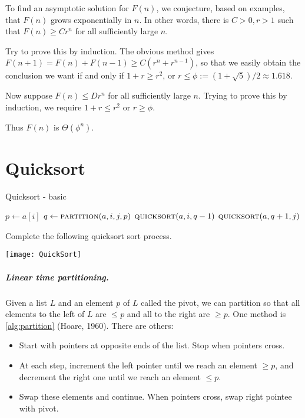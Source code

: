 To find an asymptotic solution for
$F(n)$, we conjecture, based on examples, that $F(n)$ grows
exponentially in $n$. In other words, there is $C > 0, r > 1$ such that 
$F(n) \geq C r^n$ for all sufficiently large $n$.

Try to prove this by induction. The obvious method gives 
$F(n+1) = F(n) + F(n-1) \geq C(r^n + r^{n-1})$, so that we easily obtain
the conclusion we want if and only if $1 + r \geq r^2$, or $r \leq
\phi:=(1 + \sqrt{5})/2 \approx 1.618$. 

Now suppose $F(n) \leq D
r^n$ for all sufficiently large $n$. Trying to prove this by induction,
we require $1 + r \leq r^2$ or $r \geq \phi$. 

Thus $F(n)$ is $\Theta(\phi^n)$.



\chapter{Quicksort} %
\label{sec:quicksort}

\begin{algorithm}[H]
  \caption{Quicksort - basic}    
  \label{alg:quicksort}
\begin{algorithmic}[0]
			\State $p \gets a[i]$ 
			\State $q \gets  \Call{partition}{a, i,j,p}$ 
			\State $\Call{quicksort}{a,i,q-1}$ 
			\State $\Call{quicksort}{a,q+1,j}$ 
			
		\EndIf
	\EndFunction  
\end{algorithmic}
\end{algorithm}

\begin{Boxample}[5]
Complete the following quicksort sort process.
\begin{center}
\texttt{[image: QuickSort]}
\end{center}
\end{Boxample}



\paragraph{Linear time partitioning.}
Given a list $L$ and an element $p$ of $L$ called the pivot, we can partition so
 that all elements to the left of $L$ are $\leq p$ and all to the right are 
$\geq p$. One method is \cref{alg:partition} (Hoare, 1960). There are others:
\begin{itemize}
\item Start with pointers at opposite ends of the list. Stop when pointers cross.
\item At each step, increment the left pointer until we reach an element $\geq p$, and decrement the right one until we reach an element $\leq p$. 
\item Swap these elements and continue. When pointers cross, swap right pointee with pivot.
\end{itemize}


